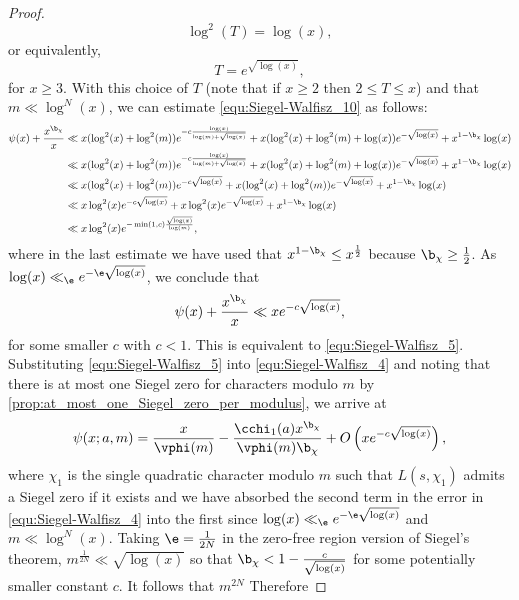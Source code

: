 \begin{proof}
      \[
        \log^{2}(T) = \log(x),
      \]
      or equivalently,
      \[
        T = e^{\sqrt{\log(x)}},
      \]
      for $x \ge 3$. With this choice of $T$ (note that if $x \ge 2$ then $2 \le T \le x$) and that $m \ll \log^{N}(x)$, we can estimate \cref{equ:Siegel-Walfisz_10} as follows:
      \begin{align*}
        \psi(x)+\frac{x^{\b_{\chi}}}{x} &\ll x(\log^{2}(x)+\log^{2}(m))e^{-c\frac{\log(x)}{\log(m)+\sqrt{\log(x)}}}+x(\log^{2}(x)+\log^{2}(m)+\log(x))e^{-\sqrt{\log(x)}}+x^{1-\b_{\chi}}\log(x) \\
        &\ll x(\log^{2}(x)+\log^{2}(m))e^{-c\frac{\log(x)}{\log(m)+\sqrt{\log(x)}}}+x(\log^{2}(x)+\log^{2}(m)+\log(x))e^{-\sqrt{\log(x)}}+x^{1-\b_{\chi}}\log(x) \\
        &\ll x(\log^{2}(x)+\log^{2}(m))e^{-c\sqrt{\log(x)}}+x(\log^{2}(x)+\log^{2}(m))e^{-\sqrt{\log(x)}}+x^{1-\b_{\chi}}\log(x) \\
        &\ll x\log^{2}(x)e^{-c\sqrt{\log(x)}}+x\log^{2}(x)e^{-\sqrt{\log(x)}}+x^{1-\b_{\chi}}\log(x) \\
        &\ll x\log^{2}(x)e^{-\min(1,c)\frac{\sqrt{\log(x)}}{\log(m)}},
      \end{align*}
      where in the last estimate we have used that $x^{1-\b_{\chi}} \le x^{\frac{1}{2}}$ because $\b_{\chi} \ge \frac{1}{2}$. As $\log(x) \ll_{\e} e^{-\e\sqrt{\log(x)}}$, we conclude that
      \[
        \psi(x)+\frac{x^{\b_{\chi}}}{x} \ll xe^{-c\sqrt{\log(x)}},
      \]
      for some smaller $c$ with $c < 1$. This is equivalent to \cref{equ:Siegel-Walfisz_5}. Substituting \cref{equ:Siegel-Walfisz_5} into \cref{equ:Siegel-Walfisz_4} and noting that there is at most one Siegel zero for characters modulo $m$ by \cref{prop:at_most_one_Siegel_zero_per_modulus}, we arrive at
      \begin{equation}\label{equ:Siegel-Walfisz_11}
        \psi(x;a,m) = \frac{x}{\vphi(m)}-\frac{\cchi_{1}(a)x^{\b_{\chi}}}{\vphi(m)\b_{\chi}}+O\left(xe^{-c\sqrt{\log(x)}}\right),
      \end{equation}
      where $\chi_{1}$ is the single quadratic character modulo $m$ such that $L(s,\chi_{1})$ admits a Siegel zero if it exists and we have absorbed the second term in the error in \cref{equ:Siegel-Walfisz_4} into the first since $\log(x) \ll_{\e} e^{-\e\sqrt{\log(x)}}$ and $m \ll \log^{N}(x)$. Taking $\e = \frac{1}{2N}$ in the zero-free region version of Siegel's theorem, $m^\frac{1}{2N} \ll \sqrt{\log(x)}$ so that $\b_{\chi} < 1-\frac{c}{\sqrt{\log(x)}}$ for some potentially smaller constant $c$. It follows that $m^{2N}$ Therefore

\end{proof}
